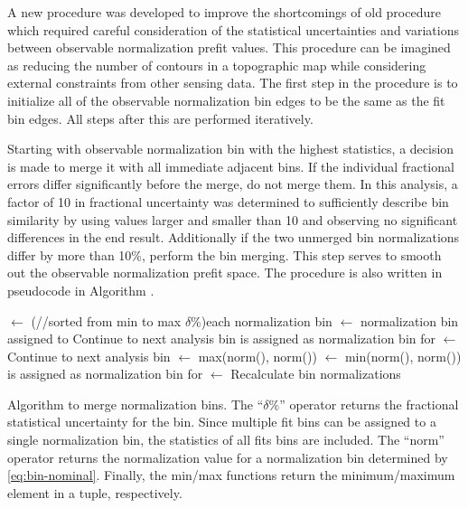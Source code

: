 A new procedure was developed to improve the shortcomings of old procedure
which required careful consideration of the statistical uncertainties
and variations between observable normalization prefit values. This
procedure can be imagined as reducing the number of contours in a
topographic map while considering external constraints from other
sensing data. The first step in the procedure is to initialize all
of the observable normalization bin edges to be the same as the fit
bin edges. All steps after this are performed iteratively.

Starting with observable normalization bin with the highest statistics,
a decision is made to merge it with all immediate adjacent bins. If
the individual fractional errors differ significantly before the merge,
do not merge them. In this analysis, a factor of 10 in fractional
uncertainty was determined to sufficiently describe bin similarity
by using values larger and smaller than 10 and observing no significant
differences in the end result. Additionally if the two unmerged bin
normalizations differ by more than 10\%, perform the bin merging.
This step serves to smooth out the observable normalization prefit
space. The procedure is also written in pseudocode in Algorithm .

\begin{algorithm}
{
\Redo $\leftarrow$ \False\;
\For(//sorted from min to max $\delta\%$){each normalization bin \D}
{
  {
    \Dprime $\leftarrow$ normalization bin assigned to \F\;
    {
      Continue to next analysis bin\;
    }
    \If{$\delta\%(\D) \geq 10 \times \delta\%(\Dprime)$}
    {
      \D is assigned as normalization bin for \F\;
      \Redo $\leftarrow$ \True\;
      Continue to next analysis bin\;
    }
    \MaxNorm  $\leftarrow$ max(norm(\D), norm(\Dprime))\;
    \MinNorm $\leftarrow$ min(norm(\D), norm(\Dprime))\;
    \If{\MaxNorm $\geq 1.1 \times$ \MinNorm}
    {
      \D is assigned as normalization bin for \F\;
      \Redo $\leftarrow$ \True\;
    }
  }
}
Recalculate bin normalizations\;
}

\caption[Algorithm to Merge Normalization Bins]{Algorithm to merge normalization bins. The ``$\delta\%$'' operator
returns the fractional statistical uncertainty for the bin. Since
multiple fit bins can be assigned to a single normalization bin, the
statistics of all fits bins are included. The ``norm'' operator
returns the normalization value for a normalization bin determined
by \eqref{eq:bin-nominal}. Finally, the min/max functions return
the minimum/maximum element in a tuple, respectively. \label{alg:binedges}}
\end{algorithm}

